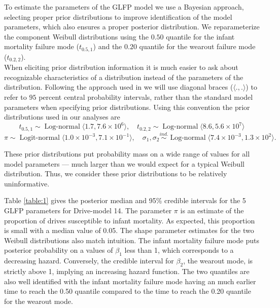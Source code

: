 \documentclass[12pt]{article}
\newcommand{\op}{\operatorname}
\begin{document}
To estimate the parameters of the GLFP model we use a Bayesian approach, selecting proper prior distributions to improve identification of the model parameters, which also ensures a proper posterior distribution. We reparameterize the component Weibull distributions using the $0.50$ quantile for the infant mortality failure mode ($t_{0.5,1}$) and the $0.20$ quantile for the wearout failure mode ($t_{0.2,2}$). \\

When eliciting prior distribution information it is much easier to ask about recognizable characteristics of a distribution instead of the parameters of the distribution.  Following the approach used in \cite[Section 15.2.2]{intervals} we will use diagonal braces ($\langle.,.\rangle$) to refer to $95$ percent central probability intervals, rather than the standard model parameters when specifying prior distributions.  Using this convention the prior distributions used in our analyses are
$$t_{0.5,1} \sim \op{Log-normal} \langle 1.7,7.6\times 10^6 \rangle,\quad
t_{0.2,2} \sim \op{Log-normal}\langle 8.6, 5.6\times 10^7 \rangle$$
$$\pi \sim \op{Logit-normal}\langle 1.0\times 10^{-3}, 7.1\times 10^{-1} \rangle,\quad
\sigma_1, \sigma_2 \stackrel{ind.}{\sim} \op{Log-normal}\langle 7.4 \times 10 ^{-3} ,1.3 \times 10^2 \rangle. $$

\noindent These prior distributions put probability mass on a wide range of values for all model parameters --- much larger than we would expect for a typical Weibull distribution.  Thus, we consider these prior distributions to be relatively uninformative. 


Table \ref{table:1} gives the posterior median and 95\% credible intervals for the 5 GLFP parameters for Drive-model 14.  The parameter $\pi$ is an estimate of the proportion of drives susceptible to infant mortality.  As expected, this proportion is small with a median value of 0.05.  The shape parameter estimates for the two Weibull distributions also match intuition.  The infant mortality failure mode puts posterior probability on a values of $\beta_1$ less than 1, which corresponds to a decreasing hazard.  Conversely, the credible interval for $\beta_2$, the wearout mode, is strictly above 1, implying an increasing hazard function.  The two quantiles are also well identified with the infant mortality failure mode having an much earlier time to reach the 0.50 quantile compared to the time to reach the 0.20 quantile for the wearout mode. 
\end{document}
